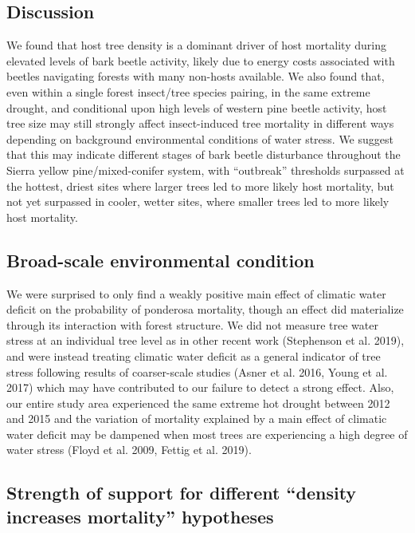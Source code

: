\documentclass[]{article}
\begin{document}
\subsection{Discussion}\label{discussion}

We found that host tree density is a dominant driver of host mortality
during elevated levels of bark beetle activity, likely due to energy
costs associated with beetles navigating forests with many non-hosts
available. We also found that, even within a single forest insect/tree
species pairing, in the same extreme drought, and conditional upon high
levels of western pine beetle activity, host tree size may still
strongly affect insect-induced tree mortality in different ways
depending on background environmental conditions of water stress. We
suggest that this may indicate different stages of bark beetle
disturbance throughout the Sierra yellow pine/mixed-conifer system, with
``outbreak'' thresholds surpassed at the hottest, driest sites where
larger trees led to more likely host mortality, but not yet surpassed in
cooler, wetter sites, where smaller trees led to more likely host
mortality.

\subsection{Broad-scale environmental
condition}\label{broad-scale-environmental-condition}

We were surprised to only find a weakly positive main effect of climatic
water deficit on the probability of ponderosa mortality, though an
effect did materialize through its interaction with forest structure. We
did not measure tree water stress at an individual tree level as in
other recent work (Stephenson et al. 2019), and were instead treating
climatic water deficit as a general indicator of tree stress following
results of coarser-scale studies (Asner et al. 2016, Young et al. 2017)
which may have contributed to our failure to detect a strong effect.
Also, our entire study area experienced the same extreme hot drought
between 2012 and 2015 and the variation of mortality explained by a main
effect of climatic water deficit may be dampened when most trees are
experiencing a high degree of water stress (Floyd et al. 2009, Fettig et
al. 2019).

\subsection{\texorpdfstring{Strength of support for different ``density
increases mortality''
hypotheses}{Strength of support for different density increases mortality hypotheses}}\label{strength-of-support-for-different-density-increases-mortality-hypotheses}
\end{document}
